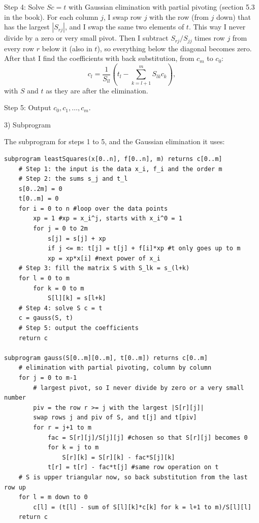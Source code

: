\documentclass[11pt]{article}
\begin{document}
Step 4: Solve $S c = t$ with Gaussian elimination with partial pivoting (section 5.3 in the book). For each column $j$, I swap row $j$ with the row (from $j$ down) that has the largest $|S_{rj}|$, and I swap the same two elements of $t$. This way I never divide by a zero or very small pivot. Then I subtract $S_{rj}/S_{jj}$ times row $j$ from every row $r$ below it (also in $t$), so everything below the diagonal becomes zero. After that I find the coefficients with back substitution, from $c_m$ to $c_0$:
\[
c_l = \frac{1}{S_{ll}}\left(t_l - \sum_{k=l+1}^{m} S_{lk} c_k\right),
\]
with $S$ and $t$ as they are after the elimination.

Step 5: Output $c_0, c_1, \dots, c_m$.

3) Subprogram

The subprogram for steps 1 to 5, and the Gaussian elimination it uses:

\begin{verbatim}
subprogram leastSquares(x[0..n], f[0..n], m) returns c[0..m]
    # Step 1: the input is the data x_i, f_i and the order m
    # Step 2: the sums s_j and t_l
    s[0..2m] = 0
    t[0..m] = 0
    for i = 0 to n #loop over the data points
        xp = 1 #xp = x_i^j, starts with x_i^0 = 1
        for j = 0 to 2m
            s[j] = s[j] + xp
            if j <= m: t[j] = t[j] + f[i]*xp #t only goes up to m
            xp = xp*x[i] #next power of x_i
    # Step 3: fill the matrix S with S_lk = s_(l+k)
    for l = 0 to m
        for k = 0 to m
            S[l][k] = s[l+k]
    # Step 4: solve S c = t
    c = gauss(S, t)
    # Step 5: output the coefficients
    return c

subprogram gauss(S[0..m][0..m], t[0..m]) returns c[0..m]
    # elimination with partial pivoting, column by column
    for j = 0 to m-1
        # largest pivot, so I never divide by zero or a very small number
        piv = the row r >= j with the largest |S[r][j]|
        swap rows j and piv of S, and t[j] and t[piv]
        for r = j+1 to m
            fac = S[r][j]/S[j][j] #chosen so that S[r][j] becomes 0
            for k = j to m
                S[r][k] = S[r][k] - fac*S[j][k]
            t[r] = t[r] - fac*t[j] #same row operation on t
    # S is upper triangular now, so back substitution from the last row up
    for l = m down to 0
        c[l] = (t[l] - sum of S[l][k]*c[k] for k = l+1 to m)/S[l][l]
    return c
\end{verbatim}
\end{document}

